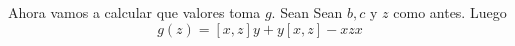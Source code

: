 \documentclass[a4paper,oneside,fleqn,11pt]{article}
\numberwithin{prop}{subsection}
\begin{document}
Ahora vamos a calcular que valores toma $g$. Sean Sean $b, c$ y $z$ como antes. Luego
\[
	g(z) = \left[x,z\right]y + y\left[x,z\right] - xzx
	\]


\end{document}
